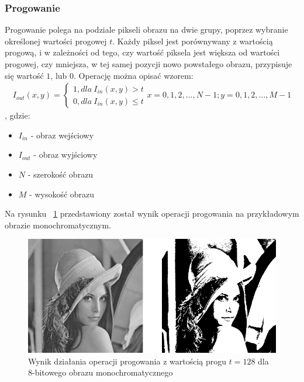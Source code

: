 \subsubsection{Progowanie}
Progowanie polega na podziale pikseli obrazu na dwie grupy, poprzez wybranie określonej wartości progowej $t$. Każdy piksel jest porównywany z wartością progową, i w zależności od tego, czy wartość piksela jest większa od wartości progowej, czy mniejsza, w tej samej pozycji nowo powstałego obrazu, przypisuje się wartość $1$, lub $0$. Operację można opisać wzorem:
\begin{gather*}
  I_{out}(x, y) = \left\{\begin{matrix}
      1, dla \: I_{in}(x, y) > t\\
      0, dla \: I_{in}(x, y) \leq t
    \end{matrix}\right. x=0,1,2,...,N-1; y=0,1,2,...,M-1
\end{gather*},
gdzie:
\begin{itemize}
  \item $I_{in}$ - obraz wejściowy
  \item $I_{out}$ - obraz wyjściowy
  \item $N$ - szerokość obrazu
  \item $M$ - wysokość obrazu
\end{itemize}
Na rysunku ~\ref{fig:lena_threshold} przedstawiony został wynik operacji progowania na przykładowym obrazie monochromatycznym.
\begin{figure}
  \centering
  \includegraphics[width=15cm]{img/lena-threshold}
  \caption{Wynik działania operacji progowania z wartością progu $t=128$ dla 8-bitowego obrazu monochromatycznego}
  \label{fig:lena_threshold}
\end{figure}
